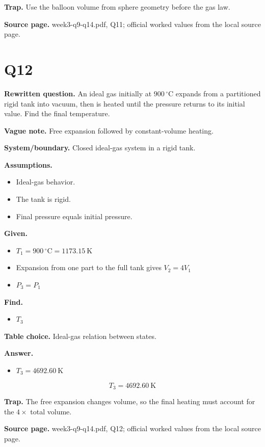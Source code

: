 \textbf{Trap.} Use the balloon volume from sphere geometry before the gas law.

\textbf{Source page.} week3-q9-q14.pdf, Q11; official worked values from the local source page.

\section*{Q12}
\textbf{Rewritten question.} An ideal gas initially at $900\,^{\circ}\mathrm{C}$ expands from a partitioned rigid tank into vacuum, then is heated until the pressure returns to its initial value. Find the final temperature.

\textbf{Vague note.} Free expansion followed by constant-volume heating.

\textbf{System/boundary.} Closed ideal-gas system in a rigid tank.

\textbf{Assumptions.}
\begin{itemize}
  \item Ideal-gas behavior.
  \item The tank is rigid.
  \item Final pressure equals initial pressure.
\end{itemize}

\textbf{Given.}
\begin{itemize}
  \item $T_1 = 900\,^{\circ}\mathrm{C} = 1173.15\ \mathrm{K}$
  \item Expansion from one part to the full tank gives $V_2 = 4V_1$
  \item $P_3 = P_1$
\end{itemize}

\textbf{Find.}
\begin{itemize}
  \item $T_3$
\end{itemize}

\textbf{Table choice.} Ideal-gas relation between states.

\textbf{Answer.}
\begin{itemize}
  \item $T_3 = 4692.60\ \mathrm{K}$
\end{itemize}

\[\boxed{T_3 = 4692.60\ \mathrm{K}}\]

\textbf{Trap.} The free expansion changes volume, so the final heating must account for the $4\times$ total volume.

\textbf{Source page.} week3-q9-q14.pdf, Q12; official worked values from the local source page.

